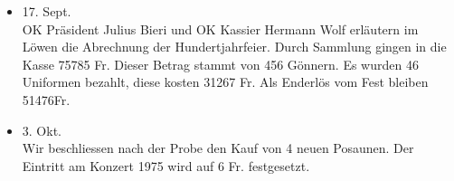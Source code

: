 \begin{multicols}{2}
\begin{itemize}
        \item[]17. Sept.\\
        OK Präsident Julius Bieri und OK Kassier Hermann Wolf erläutern im Löwen
        die Abrechnung der Hundertjahrfeier. Durch Sammlung gingen in die Kasse
        75785 Fr. Dieser Betrag stammt von 456 Gönnern. Es wurden 46 Uniformen
        bezahlt, diese kosten 31267 Fr. Als Enderlös vom Fest bleiben 51476Fr.

        \item[]3. Okt.\\
        Wir beschliessen nach der Probe den Kauf von 4 neuen Posaunen. Der
        Eintritt am Konzert 1975 wird auf 6 Fr. festgesetzt.

    \end{itemize}

\end{multicols}
